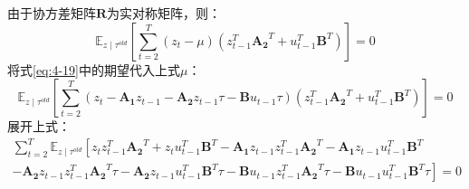 由于协方差矩阵$\mathbf{R}$为实对称矩阵，则：
\begin{equation}
    \mathbb{E}_{z \mid \tau^{old}}\left[\sum_{t=2}^T \left(z_t-\mu\right)\left(z_{t-1}^T\mathbf{A_2}^T +u_{t-1}^T\mathbf{B}^T \right)\right] = 0
    \label{eq:4-29}
\end{equation}
将式\ref{eq:4-19}中的期望代入上式$\mu$：
\begin{equation}
    \mathbb{E}_{z \mid \tau^{old}}\left[\sum_{t=2}^T \left(z_t-\mathbf{A_1}z_{t-1}-\mathbf{A_2}z_{t-1}\tau-\mathbf{B}u_{t-1}\tau \right)\left(z_{t-1}^T\mathbf{A_2}^T +u_{t-1}^T\mathbf{B}^T \right)\right] = 0
    \label{eq:4-30}
\end{equation}
展开上式：
\begin{equation}
    \begin{gathered}
    \sum_{t=2}^T \mathbb{E}_{z \mid \tau^{old}}\left[z_tz_{t-1}^T\mathbf{A_2}^T + z_tu_{t-1}^T\mathbf{B}^T -\mathbf{A_1}z_{t-1}z_{t-1}^T\mathbf{A_2}^T - \mathbf{A_1}z_{t-1}u_{t-1}^T\mathbf{B}^T \right. \\ 
    \left. - \mathbf{A_2}z_{t-1}z_{t-1}^T\mathbf{A_2}^T\tau -\mathbf{A_2}z_{t-1}u_{t-1}^T\mathbf{B}^T\tau - \mathbf{B}u_{t-1}z_{t-1}^T\mathbf{A_2}^T\tau - \mathbf{B}u_{t-1}u_{t-1}^T\mathbf{B}^T\tau\right] = 0
    \end{gathered}
    \label{eq:4-31}
\end{equation}

